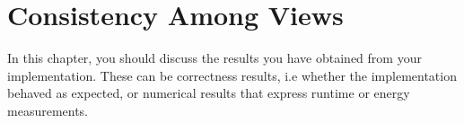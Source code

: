 \chapter{Consistency Among Views}
In this chapter, you should discuss the results you have obtained from your implementation.
These can be correctness results, i.e whether the implementation behaved as expected, or numerical results that express runtime or energy measurements.